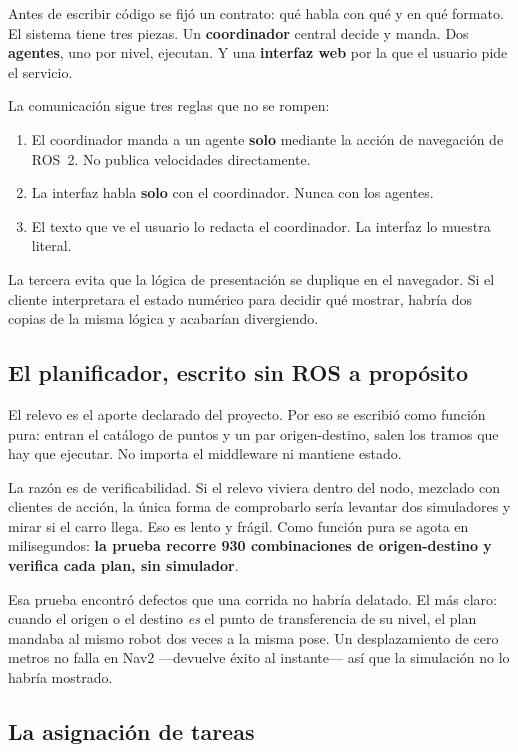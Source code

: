 Antes de escribir código se fijó un contrato: qué habla con qué y en qué formato.
El sistema tiene tres piezas. Un \textbf{coordinador} central decide y manda. Dos
\textbf{agentes}, uno por nivel, ejecutan. Y una \textbf{interfaz web} por la que
el usuario pide el servicio.

La comunicación sigue tres reglas que no se rompen:

\begin{enumerate}[leftmargin=*]
  \item El coordinador manda a un agente \textbf{solo} mediante la acción de
    navegación de ROS~2. No publica velocidades directamente.
  \item La interfaz habla \textbf{solo} con el coordinador. Nunca con los
    agentes.
  \item El texto que ve el usuario lo redacta el coordinador. La interfaz lo
    muestra literal.
\end{enumerate}

La tercera evita que la lógica de presentación se duplique en el navegador. Si el
cliente interpretara el estado numérico para decidir qué mostrar, habría dos
copias de la misma lógica y acabarían divergiendo.

\subsection{El planificador, escrito sin ROS a propósito}

El relevo es el aporte declarado del proyecto. Por eso se escribió como función
pura: entran el catálogo de puntos y un par origen-destino, salen los tramos que
hay que ejecutar. No importa el middleware ni mantiene estado.

La razón es de verificabilidad. Si el relevo viviera dentro del nodo, mezclado
con clientes de acción, la única forma de comprobarlo sería levantar dos
simuladores y mirar si el carro llega. Eso es lento y frágil. Como función pura
se agota en milisegundos: \textbf{la prueba recorre 930 combinaciones de
origen-destino y verifica cada plan, sin simulador}.

Esa prueba encontró defectos que una corrida no habría delatado. El más claro:
cuando el origen o el destino \emph{es} el punto de transferencia de su nivel, el
plan mandaba al mismo robot dos veces a la misma pose. Un desplazamiento de cero
metros no falla en Nav2 —devuelve éxito al instante— así que la simulación no lo
habría mostrado.

\subsection{La asignación de tareas}

